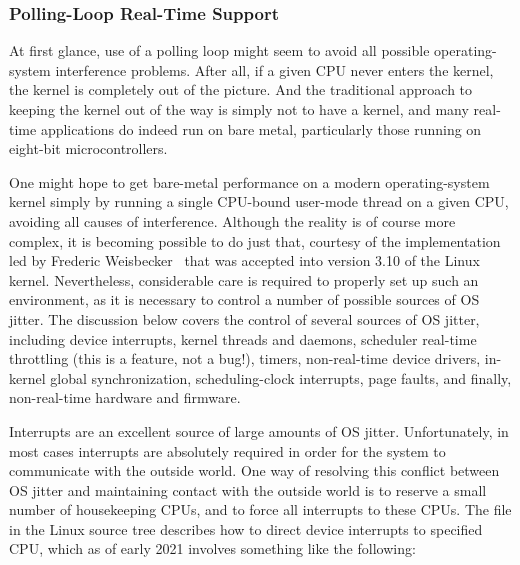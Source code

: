 \subsubsection{Polling-Loop Real-Time Support}
\label{sec:advsync:Polling-Loop Real-Time Support}

At first glance, use of a polling loop might seem to avoid all possible
operating-system interference problems.
After all, if a given CPU never enters the kernel, the kernel is
completely out of the picture.
And the traditional approach to keeping the kernel out of the way is
simply not to have a kernel, and many real-time applications do
indeed run on bare metal, particularly those running on eight-bit
microcontrollers.

One might hope to get bare-metal performance on a modern operating-system
kernel simply by running a single CPU-bound user-mode thread on a
given CPU, avoiding all causes of interference.
Although the reality is of course more complex, it is becoming
possible to do just that,
courtesy of the  implementation led by
Frederic Weisbecker~\cite{JonCorbet2013NO-HZ-FULL,FredericWeisbecker2013nohz}
that was accepted into version 3.10 of the Linux kernel.
Nevertheless, considerable care is required to properly set up such
an environment, as it is necessary to control a number of possible
sources of OS jitter.
The discussion below covers the control of several sources of OS
jitter, including device interrupts, kernel threads and daemons,
scheduler real-time throttling (this is a feature, not a bug!),
timers, non-real-time device drivers, in-kernel global synchronization,
scheduling-clock interrupts, page faults, and finally, non-real-time
hardware and firmware.

Interrupts are an excellent source of large amounts of OS jitter.
Unfortunately, in most cases interrupts are absolutely required in order
for the system to communicate with the outside world.
One way of resolving this conflict between OS jitter and maintaining
contact with the outside world is to reserve a small number of
housekeeping CPUs, and to force all interrupts to these CPUs.
The  file in the Linux source tree
describes how to direct device interrupts to specified CPU,
which as of early 2021 involves something like the following:



